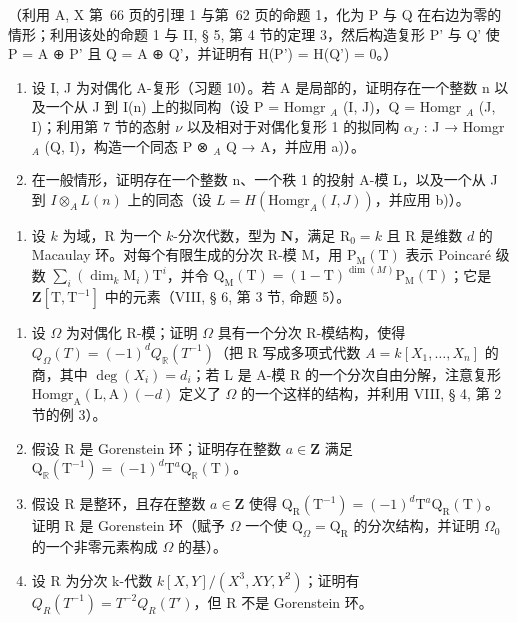 （利用 A, X 第~66 页的引理 1 与第~62 页的命题 1，化为 P 与 Q 在右边为零的情形；利用该处的命题 1 与 II, § 5, 第 4 节的定理 3，然后构造复形 P' 与 Q' 使 P = A ⊕ P' 且 Q = A ⊕ Q'，并证明有 H(P') = H(Q') = 0。）

\begin{enumerate}
\def\labelenumi{\alph{enumi})}
\setcounter{enumi}{1}
\item
  设 I, J 为对偶化 A-复形（习题 10）。若 A 是局部的，证明存在一个整数 n 以及一个从 J 到 I(n) 上的拟同构（设 P = Homgr \(_A\) (I, J)，Q = Homgr \(_A\) (J, I)；利用第 7 节的态射 \(\nu\) 以及相对于对偶化复形 1 的拟同构 \(\alpha_{J}\) : J → Homgr \(_A\) (Q, I)，构造一个同态 P ⊗ \(_A\) Q → A，并应用 a)）。
\item
  在一般情形，证明存在一个整数 n、一个秩 1 的投射 A-模 L，以及一个从 J 到 \(I \otimes_{A} L(n)\) 上的同态（设 \(L = H(\text{Homgr}_{A}(I, J))\)，并应用 b)）。
\end{enumerate}

\begin{enumerate}
\def\labelenumi{\arabic{enumi})}
\setcounter{enumi}{11}
\tightlist
\item
  设 \(k\) 为域，R 为一个 \(k\)-分次代数，型为 \(\mathbf{N}\)，满足 \(\mathrm{R}_0 = k\) 且 R 是维数 \(d\) 的 Macaulay 环。对每个有限生成的分次 R-模 M，用 \(\mathrm{P}_{\mathrm{M}}(\mathrm{T})\) 表示 Poincaré 级数 \(\sum_{i} (\dim_k \mathrm{M}_i) \mathrm{T}^i\)，并令 \(\mathrm{Q}_{\mathrm{M}}(\mathrm{T}) = (1 - \mathrm{T})^{\dim(M)} \mathrm{P}_{\mathrm{M}}(\mathrm{T})\)；它是 \(\mathbf{Z}[\mathrm{T}, \mathrm{T}^{-1}]\) 中的元素（VIII, § 6, 第 3 节, 命题 5）。
\end{enumerate}

\begin{enumerate}
\def\labelenumi{\alph{enumi})}
\item
  设 \(\Omega\) 为对偶化 R-模；证明 \(\Omega\) 具有一个分次 R-模结构，使得 \(Q_{\Omega}(T) = (-1)^{d} Q_{\mathbb{R}}(T^{-1})\)（把 R 写成多项式代数 \(A = k[X_1, \ldots, X_n]\) 的商，其中 \(\deg(X_i) = d_i\)；若 L 是 A-模 R 的一个分次自由分解，注意复形 \(\mathrm{Homgr}_{\mathrm{A}}(\mathrm{L}, \mathrm{A})(-d)\) 定义了 \(\Omega\) 的一个这样的结构，并利用 VIII, § 4, 第 2 节的例 3）。
\item
  假设 R 是 Gorenstein 环；证明存在整数 \(a \in \mathbf{Z}\) 满足 \(\mathrm{Q}_{\mathbb{R}}(\mathrm{T}^{-1}) = (-1)^{d}\mathrm{T}^{a}\mathrm{Q}_{\mathbb{R}}(\mathrm{T})\)。
\item
  假设 R 是整环，且存在整数 \(a \in \mathbf{Z}\) 使得 \(\mathrm{Q}_{\mathrm{R}}(\mathrm{T}^{-1}) = (-1)^{d}\mathrm{T}^{a}\mathrm{Q}_{\mathrm{R}}(\mathrm{T})\)。证明 R 是 Gorenstein 环（赋予 \(\Omega\) 一个使 \(\mathrm{Q}_{\Omega} = \mathrm{Q}_{\mathrm{R}}\) 的分次结构，并证明 \(\Omega_{0}\) 的一个非零元素构成 \(\Omega\) 的基）。
\item
  设 R 为分次 k-代数 \(k[X,Y]/(X^{3},XY,Y^{2})\)；证明有 \(Q_{R}(T^{-1}) = T^{-2}Q_{R}(T')\)，但 R 不是 Gorenstein 环。
\end{enumerate}

